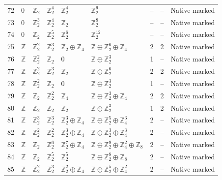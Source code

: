 \documentclass[10pt]{article}
\begin{document}
\begin{longtable}{r|lllll|rrl}
72 & $0$ & $\mathbb{Z}_{2}$ & $\mathbb{Z}_{2}^{4}$ & $\mathbb{Z}_{2}^{4}$ & $\mathbb{Z}_{2}^{9}$ & -- & -- & Native marked\\
73 & $0$ & $\mathbb{Z}_{2}^{3}$ & $\mathbb{Z}_{2}^{4}$ & $\mathbb{Z}_{2}$ & $\mathbb{Z}_{2}^{8}$ & -- & -- & Native marked\\
74 & $0$ & $\mathbb{Z}_{2}$ & $\mathbb{Z}_{2}^{5}$ & $\mathbb{Z}_{2}^{6}$ & $\mathbb{Z}_{2}^{12}$ & -- & -- & Native marked\\
75 & $\mathbb{Z}$ & $\mathbb{Z}_{2}^{2}$ & $\mathbb{Z}_{2}^{3}$ & $\mathbb{Z}_{2}\oplus \mathbb{Z}_{4}$ & $\mathbb{Z}\oplus \mathbb{Z}_{2}^{6}\oplus \mathbb{Z}_{4}$ & 2 & 2 & Native marked\\
76 & $\mathbb{Z}$ & $\mathbb{Z}_{2}^{2}$ & $\mathbb{Z}_{2}$ & $0$ & $\mathbb{Z}\oplus \mathbb{Z}_{2}^{3}$ & 1 & -- & Native marked\\
77 & $\mathbb{Z}$ & $\mathbb{Z}_{2}^{2}$ & $\mathbb{Z}_{2}^{3}$ & $\mathbb{Z}_{2}$ & $\mathbb{Z}\oplus \mathbb{Z}_{2}^{6}$ & 2 & 2 & Native marked\\
78 & $\mathbb{Z}$ & $\mathbb{Z}_{2}^{2}$ & $\mathbb{Z}_{2}$ & $0$ & $\mathbb{Z}\oplus \mathbb{Z}_{2}^{3}$ & 1 & -- & Native marked\\
79 & $\mathbb{Z}$ & $\mathbb{Z}_{2}$ & $\mathbb{Z}_{2}^{2}$ & $\mathbb{Z}_{4}$ & $\mathbb{Z}\oplus \mathbb{Z}_{2}^{3}\oplus \mathbb{Z}_{4}$ & 2 & 2 & Native marked\\
80 & $\mathbb{Z}$ & $\mathbb{Z}_{2}$ & $\mathbb{Z}_{2}$ & $\mathbb{Z}_{2}$ & $\mathbb{Z}\oplus \mathbb{Z}_{2}^{3}$ & 1 & 2 & Native marked\\
81 & $\mathbb{Z}$ & $\mathbb{Z}_{2}^{3}$ & $\mathbb{Z}_{2}^{3}$ & $\mathbb{Z}_{2}^{3}\oplus \mathbb{Z}_{4}$ & $\mathbb{Z}\oplus \mathbb{Z}_{2}^{5}\oplus \mathbb{Z}_{4}^{3}$ & 2 & -- & Native marked\\
82 & $\mathbb{Z}$ & $\mathbb{Z}_{2}^{2}$ & $\mathbb{Z}_{2}^{2}$ & $\mathbb{Z}_{2}^{3}\oplus \mathbb{Z}_{4}$ & $\mathbb{Z}\oplus \mathbb{Z}_{2}^{3}\oplus \mathbb{Z}_{4}^{3}$ & 2 & -- & Native marked\\
83 & $\mathbb{Z}$ & $\mathbb{Z}_{2}$ & $\mathbb{Z}_{2}^{6}$ & $\mathbb{Z}_{2}^{7}\oplus \mathbb{Z}_{4}$ & $\mathbb{Z}\oplus \mathbb{Z}_{2}^{9}\oplus \mathbb{Z}_{4}^{2}\oplus \mathbb{Z}_{8}$ & 2 & -- & Native marked\\
84 & $\mathbb{Z}$ & $\mathbb{Z}_{2}$ & $\mathbb{Z}_{2}^{5}$ & $\mathbb{Z}_{2}^{5}$ & $\mathbb{Z}\oplus \mathbb{Z}_{2}^{8}\oplus \mathbb{Z}_{8}$ & 2 & -- & Native marked\\
85 & $\mathbb{Z}$ & $\mathbb{Z}_{2}^{2}$ & $\mathbb{Z}_{2}^{3}$ & $\mathbb{Z}_{2}^{2}\oplus \mathbb{Z}_{4}$ & $\mathbb{Z}\oplus \mathbb{Z}_{2}^{5}\oplus \mathbb{Z}_{4}^{2}$ & 2 & -- & Native marked\\

\end{longtable}
\end{document}
